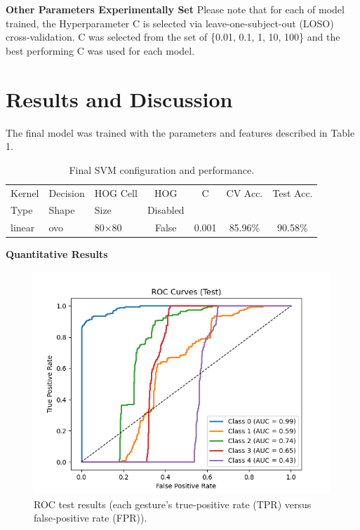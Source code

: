 \documentclass{article}
\begin{document}
\noindent\textbf{Other Parameters Experimentally Set} Please note that for each of model trained, the Hyperparameter C is selected via
leave-one-subject-out (LOSO) cross-validation. C was selected from the set of \{0.01, 0.1, 1, 10, 100\} and the best performing C was used for each model.


\section{Results and Discussion} 

The final model was trained with the parameters and features described in Table 1.

\begin{table}[h]
\centering
\scriptsize
\begin{tabular}{l l l c c c c}
\hline
Kernel & Decision & HOG Cell & HOG & C & CV Acc. & Test Acc. \\
Type   & Shape    & Size     & Disabled &  &  &  \\
\hline
linear & ovo & 80×80 & False & 0.001 & 85.96\% & 90.58\% \\
\hline
\end{tabular}
\caption{Final SVM configuration and performance.}
\end{table}

\medskip
\noindent\textbf{Quantitative Results}

\begin{figure}
  \centering
  \includegraphics[width=\linewidth]{ROC_Test.png}
  \caption*{ROC test results (each gesture’s true‑positive rate (TPR) versus false‑positive rate (FPR)).}
\end{figure}
\end{document}
